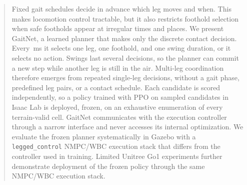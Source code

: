 \begin{abstract}
  Fixed gait schedules decide in advance which leg moves and when.
  This makes locomotion control tractable, but it also restricts
  foothold selection when safe footholds appear at irregular times
  and places. We present GaitNet, a learned planner that makes only
  the discrete contact decision. Every \corlControlTickMs\,ms it
  selects one leg, one foothold, and one swing duration, or it selects
  no action. Swings last several decisions, so the planner can commit
  a new step while another leg is still in the air. Multi-leg
  coordination therefore emerges from repeated single-leg decisions,
  without a gait phase, predefined leg pairs, or a contact schedule.
  Each candidate is scored independently, so a policy trained with
  PPO on sampled candidates in Isaac Lab is deployed, frozen, on an
  exhaustive enumeration of every terrain-valid cell. GaitNet
  communicates with the execution controller through a narrow
  interface and never accesses its internal optimization. We evaluate
  the frozen planner systematically in Gazebo with a
  \texttt{legged\_control} NMPC/WBC execution stack that differs from
  the controller used in training.  Limited Unitree Go1
  experiments further demonstrate deployment of the frozen policy
  through the same NMPC/WBC execution stack.
\end{abstract}
